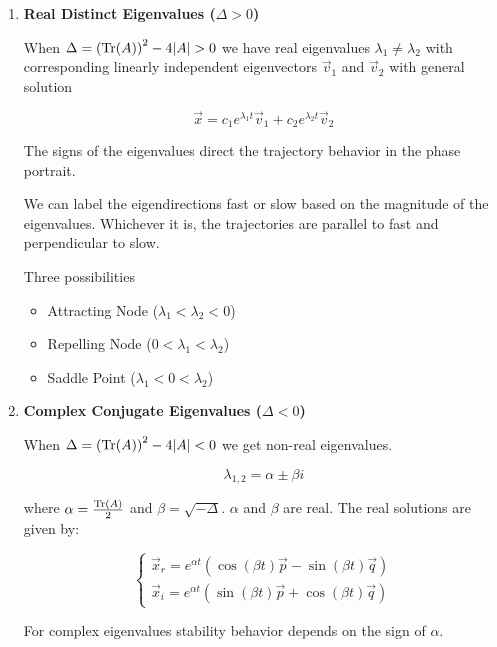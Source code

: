     \begin{enumerate}
        \item \textbf{Real Distinct Eigenvalues ($\Delta > 0$)}

            When $\Delta = {({\rm Tr}(A))}^2 - 4|A| > 0$ we have real eigenvalues $\lambda_1 \neq \lambda_2$ with corresponding linearly independent eigenvectors $\vec{v}_1$ and $\vec{v}_2$ with general solution

            \[ \vec{x} = c_1 e^{\lambda_1 t} \vec{v}_1 + c_2 e^{\lambda_2 t} \vec{v}_2 \]

            The signs of the eigenvalues direct the trajectory behavior in the phase portrait.

            We can label the eigendirections fast or slow based on the magnitude of the eigenvalues. Whichever it is, the trajectories are parallel to fast and perpendicular to slow.

            Three possibilities

                \begin{itemize}
                    \item Attracting Node ($\lambda_1 < \lambda_2 < 0$)
                    \item Repelling Node ($0 < \lambda_1 < \lambda_2$)
                    \item Saddle Point ($\lambda_1 < 0 < \lambda_2$)
                \end{itemize}

            \item \textbf{Complex Conjugate Eigenvalues ($\Delta < 0$)}

                When $\Delta = {({\rm Tr}(A))}^2 - 4|A| < 0$ we get non-real eigenvalues.

                \[ \lambda_{1,2} = \alpha \pm \beta i \]

                where $\alpha = \frac{ {\rm Tr}(A)}{2}$ and $\beta = \sqrt{-\Delta}$. $\alpha$ and $\beta$ are real. The real solutions are given by:

                \[ \begin{cases}
                        \vec{x}_r = e^{\alpha t} ( \cos(\beta t) \vec{p} - \sin(\beta t)\vec{q})\\
                        \vec{x}_i = e^{\alpha t} ( \sin(\beta t) \vec{p} + \cos(\beta t)\vec{q})
                    \end{cases} \]

                For complex eigenvalues stability behavior depends on the sign of $\alpha$.


\end{enumerate}
